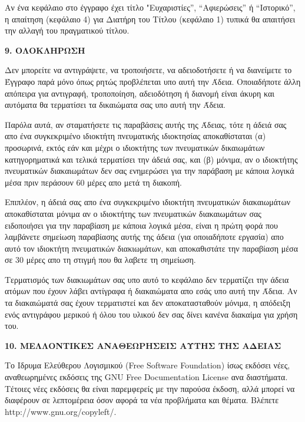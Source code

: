 Αν ένα κεφάλαιο στο έγγραφο έχει τίτλο "Ευχαριστίες”, “Αφιερώσεις” ή “Ιστορικό”, η απαίτηση (κεφάλαιο 4) για Διατήρη του Τίτλου (κεφάλαιο 1) τυπικά θα απαιτήσει την αλλαγή του πραγματικού τίτλου.


\begin{center}
{\Large\bf 9. ΟΛΟΚΛΗΡΩΣΗ\par}
\end{center}


Δεν μπορείτε να αντιγράψετε, να τροποιήσετε, να αδειοδοτήσετε ή να διανείμετε το Έγγραφο παρά μόνο όπως ρητώς προβλέπεται υπο αυτή την Άδεια. Οποιαδήποτε άλλη απόπειρα για αντιγραφή, τροποποίηση, αδειοδότηση ή διανομή είναι άκυρη και αυτόματα θα τερματίσει τα δικαιώματα σας υπο αυτή την Άδεια.

Παρόλα αυτά, αν σταματήσετε τις παραβάσεις αυτής της Άδειας, τότε η άδειά σας απο ένα συγκεκριμένο ιδιοκτήτη πνευματικής ιδιοκτησίας αποκαθίσταται (α) προσωρινά, εκτός εάν και μέχρι ο ιδιοκτήτης των πνευματικών δικαιωμάτων κατηγορηματικά και τελικά τερματίσει την άδειά σας, και (β) μόνιμα, αν ο ιδιοκτήτης πνευματικών διακαιωμάτων δεν σας ενημερώσει για την παράβαση με κάποια λογικά μέσα πριν περάσουν 60 μέρες απο μετά τη διακοπή.

Επιπλέον, η άδειά σας απο ένα συγκεκριμένο ιδιοκτήτη πνευματικών διακαιωμάτων αποκαθίσταται μόνιμα αν ο ιδιοκτήτης των πνευματικών διακαιωμάτων σας ειδοποιήσει για την παραβίαση με κάποια λογικά μέσα, είναι η πρώτη φορά που λαμβάνετε σημείωση παραβίασης αυτής της άδεια (για οποιαδήποτε εργασία) απο αυτό τον ιδιοκτήτη πνευματικών διακιωμάτων, και αποκαθιστάτε την παραβίαση μέσα σε 30 μέρες απο τη στιγμή που θα λαβετε τη σημείωση.

Τερματισμός των διακιωμάτων σας υπο αυτό το κεφάλαιο δεν τερματίζει την άδεια ατόμων που έχουν λάβει αντίγραφα ή διακαιώματα απο εσάς υπο αυτή την Άδεια. Αν τα διακαιώματά σας έχουν τερματιστεί και δεν αποκατασταθούν μόνιμα, η απόδειξη ενός αντιγράφου μερικού ή όλου του υλικού δεν σας δίνει κανένα διακαίμα για χρήση του.


\begin{center}
{\Large\bf 10. ΜΕΛΛΟΝΤΙΚΕΣ ΑΝΑΘΕΩΡΗΣΕΙΣ ΑΥΤΗΣ ΤΗΣ ΑΔΕΙΑΣ\par}
\end{center}


Το Ιδρυμα Ελεύθερου Λογισμικού (Free Software Foundation) ίσως εκδόσει νέες, αναθεωρημένες εκδόσεις της GNU Free Documentation License ανα διαστήματα. Τέτοιες νέες εκδόσεις θα είναι παρεμφερείς με την παρούσα έκδοση, αλλά μπορεί να διαφέρουν σε λεπτομέρεια όσον αφορά τα νέα προβλήματα και θέματα. Βλέπετε
http://www.gnu.org/copyleft/.

